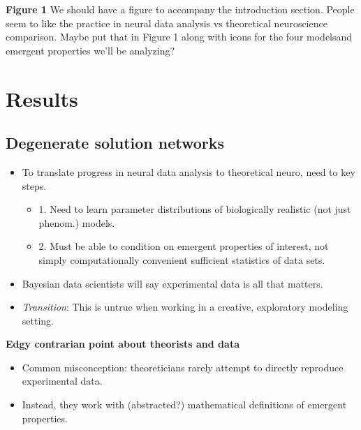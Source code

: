 \documentclass[11pt]{article}
\begin{document}
\textbf{Figure 1}
We should have a figure to accompany the introduction section.  People seem to like the practice in neural data analysis vs theoretical neuroscience comparison.  Maybe put that in Figure 1 along with icons for the four modelsand emergent properties we'll be analyzing?

\section{Results}
\subsection{Degenerate solution networks}
\begin{itemize}
\item To translate progress in neural data analysis to theoretical neuro, need to key steps.
\begin{itemize}
\item 1. Need to learn parameter distributions of biologically realistic (not just phenom.) models.
\item 2. Must be able to condition on emergent properties of interest, not simply computationally convenient sufficient statistics of data sets.
\end{itemize}
\item Bayesian data scientists will say experimental data is all that matters.  
\item \textit{Transition}: This is untrue when working in a creative, exploratory modeling setting.
\end{itemize}

\textbf{Edgy contrarian point about theorists and data}
\begin{itemize}
\item Common misconception: theoreticians rarely attempt to directly reproduce experimental data. 
\item Instead, they work with (abstracted?) mathematical definitions of emergent properties.  
\end{itemize}
\end{document}
